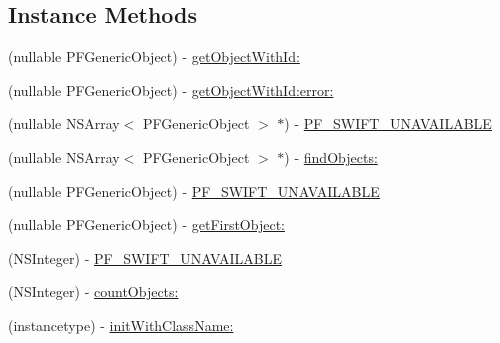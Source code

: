 \subsection*{Instance Methods}
\begin{DoxyCompactItemize}
\item 
(nullable P\+F\+Generic\+Object) -\/ \hyperlink{class_p_f_query_a5e484f102ce343ed36a2c6cdd59ecf38}{get\+Object\+With\+Id\+:}
\item 
(nullable P\+F\+Generic\+Object) -\/ \hyperlink{class_p_f_query_a5815fa0fb000f3dce7c0a736f9cd5a0c}{get\+Object\+With\+Id\+:error\+:}
\item 
(nullable N\+S\+Array$<$ P\+F\+Generic\+Object $>$ $\ast$) -\/ \hyperlink{class_p_f_query_af68999a5e95b58b3fc2b653d0db531be}{P\+F\+\_\+\+S\+W\+I\+F\+T\+\_\+\+U\+N\+A\+V\+A\+I\+L\+A\+B\+L\+E}
\begin{DoxyCompactList}\small\item\em 

 \end{DoxyCompactList}\item 
(nullable N\+S\+Array$<$ P\+F\+Generic\+Object $>$ $\ast$) -\/ \hyperlink{class_p_f_query_afc8a214e49e9504d85d5cc926d16f0b2}{find\+Objects\+:}
\item 
(nullable P\+F\+Generic\+Object) -\/ \hyperlink{class_p_f_query_aef952ec6d7ea21ed0e51dd6d7109581f}{P\+F\+\_\+\+S\+W\+I\+F\+T\+\_\+\+U\+N\+A\+V\+A\+I\+L\+A\+B\+L\+E}
\begin{DoxyCompactList}\small\item\em 

 \end{DoxyCompactList}\item 
(nullable P\+F\+Generic\+Object) -\/ \hyperlink{class_p_f_query_a9508c12fceeb61e737b6c9076bb89b71}{get\+First\+Object\+:}
\item 
(N\+S\+Integer) -\/ \hyperlink{class_p_f_query_a2ad37d304b8c85e5d91ddf52a2d3232a}{P\+F\+\_\+\+S\+W\+I\+F\+T\+\_\+\+U\+N\+A\+V\+A\+I\+L\+A\+B\+L\+E}
\begin{DoxyCompactList}\small\item\em 

 \end{DoxyCompactList}\item 
(N\+S\+Integer) -\/ \hyperlink{class_p_f_query_a6211e0b92adc4a098b65e24a4cbdbaa0}{count\+Objects\+:}
\item 
(instancetype) -\/ \hyperlink{class_p_f_query_ae2f279a9dec94cfb9e02bcab14f5912e}{init\+With\+Class\+Name\+:}
\begin{DoxyCompactList}\small\item\em 


\end{DoxyCompactList}
\end{DoxyCompactItemize}
